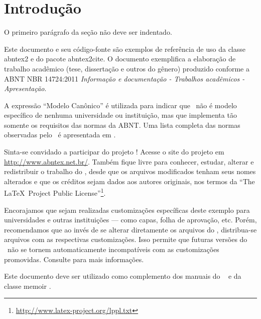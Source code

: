 \documentclass[
	12pt,				%
	openright,			%
	oneside,			%
	a4paper,			%
	english,			%
	brazil				%
	]{abntex2}
\begin{document}
\textual

\chapter{Introdução}
\noindent O primeiro parágrafo da seção não deve ser indentado.

Este documento e seu código-fonte são exemplos de referência de uso da classe
\textsf{abntex2} e do pacote \textsf{abntex2cite}. O documento 
exemplifica a elaboração de trabalho acadêmico (tese, dissertação e outros do
gênero) produzido conforme a ABNT NBR 14724:2011 \emph{Informação e documentação
- Trabalhos acadêmicos - Apresentação}.

A expressão ``Modelo Canônico'' é utilizada para indicar que \abnTeX\ não é
modelo específico de nenhuma universidade ou instituição, mas que implementa tão
somente os requisitos das normas da ABNT. Uma lista completa das normas
observadas pelo \abnTeX\ é apresentada em .

Sinta-se convidado a participar do projeto \abnTeX! Acesse o site do projeto em
\url{http://www.abntex.net.br/}. Também fique livre para conhecer,
estudar, alterar e redistribuir o trabalho do \abnTeX, desde que os arquivos
modificados tenham seus nomes alterados e que os créditos sejam dados aos
autores originais, nos termos da ``The \LaTeX\ Project Public
License''\footnote{\url{http://www.latex-project.org/lppl.txt}}.

Encorajamos que sejam realizadas customizações específicas deste exemplo para
universidades e outras instituições --- como capas, folha de aprovação, etc.
Porém, recomendamos que ao invés de se alterar diretamente os arquivos do
\abnTeX, distribua-se arquivos com as respectivas customizações.
Isso permite que futuras versões do \abnTeX~não se tornem automaticamente
incompatíveis com as customizações promovidas. Consulte
 para mais informações.

Este documento deve ser utilizado como complemento dos manuais do \abnTeX\ 
\cite{abntex2classe,abntex2cite,abntex2cite-alf} e da classe \textsf{memoir}
\cite{memoir}. 
\end{document}
